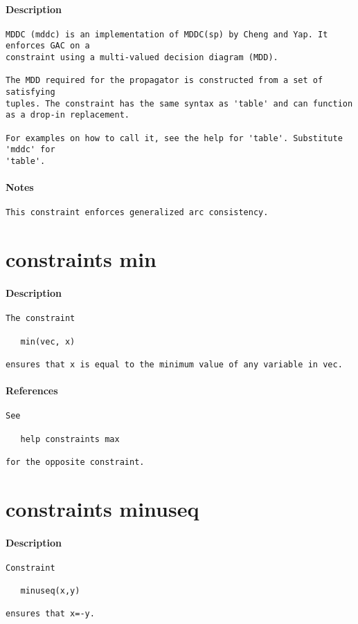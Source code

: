 \paragraph{Description}
{\footnotesize
\begin{verbatim}
MDDC (mddc) is an implementation of MDDC(sp) by Cheng and Yap. It enforces GAC on a 
constraint using a multi-valued decision diagram (MDD). 

The MDD required for the propagator is constructed from a set of satisfying
tuples. The constraint has the same syntax as 'table' and can function
as a drop-in replacement. 

For examples on how to call it, see the help for 'table'. Substitute 'mddc' for
'table'.
\end{verbatim}
}
\paragraph{Notes}
{\footnotesize
\begin{verbatim}
This constraint enforces generalized arc consistency.
\end{verbatim}
}
\section{constraints min}
\paragraph{Description}
{\footnotesize
\begin{verbatim}
The constraint

   min(vec, x)

ensures that x is equal to the minimum value of any variable in vec.
\end{verbatim}
}
\paragraph{References}
{\footnotesize
\begin{verbatim}
See

   help constraints max

for the opposite constraint.
\end{verbatim}
}
\section{constraints minuseq}
\paragraph{Description}
{\footnotesize
\begin{verbatim}
Constraint

   minuseq(x,y)

ensures that x=-y.
\end{verbatim}
}
